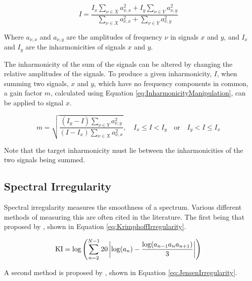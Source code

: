 		\begin{equation}
			I = \frac{I_{x}\sum_{\nu \in X} a_{\nu,x}^{2} + I_{y}\sum_{\nu \in Y} a_{\nu,y}^{2}}
			         {\sum_{\nu \in X} a_{\nu,x}^{2} + \sum_{\nu \in Y} a_{\nu,y}^{2}}
			\label{eq:InharmonicitySum}
		\end{equation}

		Where $a_{\nu,x}$ and $a_{\nu,y}$ are the amplitudes of frequency $\nu$ in signals $x$ and $y$, and $I_{x}$
		and $I_{y}$ are the inharmonicities of signals $x$ and $y$.

		The inharmonicity of the sum of the signals can be altered by changing the relative amplitudes of the
		signals. To produce a given inharmonicity, $I$, when summing two signals, $x$ and $y$, which have no
		frequency components in common, a gain factor $m$, calculated using Equation
		\ref{eq:InharmonicityManipulation}, can be applied to signal $x$.

		\begin{equation}
			m = \sqrt{\frac{(I_{y} - I)\sum_{\nu \in Y} a_{\nu,y}^{2}}
			               {(I - I_{x})\sum_{\nu \in X} a_{\nu,x}^{2}}},
			\quad I_{x} \leq I < I_{y} \quad \textrm{or} \quad I_{y} < I \leq I_{x}
			\label{eq:InharmonicityManipulation}
		\end{equation}

		Note that the target inharmonicity must lie between the inharmonicities of the two signals being summed.

	\subsection{Spectral Irregularity}
	\label{sec:FeatureControl-Parameterisation-Irregularity}
		Spectral irregularity measures the smoothness of a spectrum. Various different methods of measuring this
		are often cited in the literature. The first being that proposed by \citet{krimphoff1994caracterisation},
		shown in Equation \ref{eq:KrimphoffIrregularity}.

		\begin{equation}
			\textrm{KI} = \log \left( \sum_{n = 2}^{N - 1}
				                  20 \left|\log(a_{n}) - \frac{\log(a_{n-1}a_{n}a_{n+1})}
				                                             {3}\right|
					   \right)
			\label{eq:KrimphoffIrregularity}
		\end{equation}

		A second method is proposed by \citet{jensen1999timbre}, shown in Equation \ref{eq:JensenIrregularity}.

